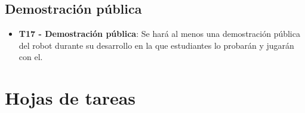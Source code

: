 \subsection{Demostración pública}

\begin{itemize}
\item \textbf{T17 - Demostración pública}: Se hará al menos una demostración pública del robot durante su desarrollo en la que estudiantes lo probarán y jugarán con el.
\end{itemize}

\section{Hojas de tareas}


















